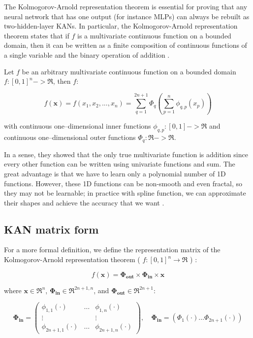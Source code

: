 \documentclass[12pt,a4paper]{article}
\begin{document}
The Kolmogorov-Arnold representation theorem is essential for proving that any neural network that has one output (for instance MLPs) can always be rebuilt as two-hidden-layer KANs. In particular, the Kolmogorov-Arnold representation theorem states that if $f$ is a multivariate continuous function on a bounded domain, then it can be written as a finite composition of continuous functions of a single variable and the binary operation of addition \cite{KAtheorem, KArevisited}.

\begin{theorem} 
\label{Kolmogorov-Arnold}
Let $f$ be an arbitrary multivariate continuous function on a bounded domain $f:[0,1]^n -> \Re$, then $f$:

$$f(\textbf{x}) = f(x_1,x_2,...,x_n) = \sum_{q=1}^{2n+1} \Phi_q(\sum_{p=1}^n \phi_{q,p}(x_p))$$

with continuous one–dimensional inner functions $\phi_{q,p}:[0,1] -> \Re$ and continuous one–dimensional outer functions $\Phi_q:\Re -> \Re$.
\end{theorem} 

In a sense, they showed that the only true multivariate function is addition since every other function can be written using univariate functions and sum. The great advantage is that we have to learn only a polynomial number of 1D functions. However, these 1D functions can be non-smooth and even fractal, so they may not be learnable; in practice with spline function, we can approximate their shapes and achieve the accuracy that we want \cite{KAN}.

\subsection{KAN matrix form}
\label{sec:ma}
For a more formal definition, we define the representation matrix of the Kolmogorov-Arnold representation theorem ( $f: [0,1]^n \rightarrow \Re$ ) \cite{KAN}:

$$f(\textbf{x}) = \boldsymbol{\Phi_{out}} \times \boldsymbol{\Phi_{in} }\times \textbf{x}$$

where $\textbf{x} \in \Re^n$, $\boldsymbol{\Phi_{in}} \in \Re^{2n+1,n}$, and $\boldsymbol{\Phi_{out}} \in \Re^{2n+1}$:

\[
\boldsymbol{\Phi_{in}} = 
\begin{pmatrix}
\phi_{1,1}(\cdot) & \dots & \phi_{1,n}(\cdot) \\
\vdots &   & \vdots \\
\phi_{2n+1,1}(\cdot) & \dots & \phi_{2n+1,n}(\cdot)
\end{pmatrix},
\quad \boldsymbol{\Phi_{in}} = (\Phi_{1}(\cdot) \dots \Phi_{2n+1}(\cdot))
\]
\end{document}
